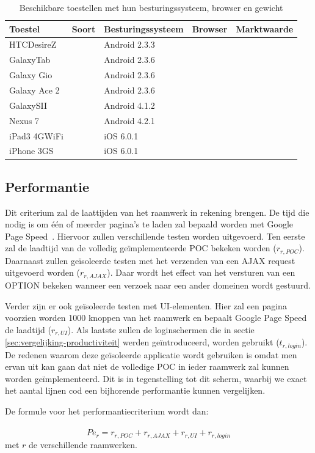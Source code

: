 \begin{table}[h]
  \centering
  \begin{tabular}{lllll}
    \toprule
    \textbf{Toestel} & \textbf{Soort} &\textbf{Besturingssysteem} & \textbf{Browser} & \textbf{Marktwaarde}\\
    \midrule
    HTCDesireZ & & Android 2.3.3 &  & \\
    GalaxyTab & & Android 2.3.6 &  & \\
    Galaxy Gio & & Android 2.3.6 &  & \\
    Galaxy Ace 2 & & Android 2.3.6 &  & \\
    GalaxySII & & Android 4.1.2 &  & \\
    Nexus 7 & &Android 4.2.1  &  & \\
    iPad3 4GWiFi & & iOS 6.0.1 &  & \\
    iPhone 3GS & & iOS 6.0.1 &  & \\
    \bottomrule
  \end{tabular}
  \caption{Beschikbare toestellen met hun besturingssysteem, browser en gewicht}
  \label{tabel:toestellen-hci}
\end{table}

\subsection{Performantie}
\label{sec:vergelijking-performantie}
Dit criterium zal de laattijden van het raamwerk in rekening brengen.
De tijd die nodig is om één of meerder pagina's te laden zal bepaald worden met Google Page Speed~\cite{Morgan2011}. 
Hiervoor zullen verschillende testen worden uitgevoerd. 
Ten eerste zal de laadtijd van de volledig geïmplementeerde POC bekeken worden ($r_{r,POC}$). 
Daarnaast zullen geïsoleerde testen met het verzenden van een AJAX request uitgevoerd worden ($r_{r,AJAX}$).
Daar wordt het effect van het versturen van een OPTION  bekeken wanneer een verzoek naar een ander domeinen wordt gestuurd.

Verder zijn er ook geïsoleerde testen met UI-elementen. 
Hier zal een  pagina voorzien worden 1000 knoppen van het raamwerk en bepaalt Google Page Speed de laadtijd ($r_{r,UI}$). 
Als laatste zullen de loginschermen die in sectie \ref{sec:vergelijking-productiviteit} werden geïntroduceerd, worden gebruikt ($t_{r,login}$). 
De redenen waarom deze geïsoleerde applicatie wordt gebruiken is omdat men ervan uit kan gaan dat niet de volledige POC in ieder raamwerk zal kunnen worden geïmplementeerd. 
Dit is in tegenstelling tot dit scherm, waarbij we exact het aantal lijnen cod een bijhorende performantie kunnen vergelijken.

De formule voor het performantiecriterium wordt dan: 
\paragraph{}
\begin{equation}
  Pe_r=r_{r,POC}+r_{r,AJAX}+r_{r,UI}+r_{r,login} 
  \label{eq:performantie}
\end{equation}
met $r$ de verschillende raamwerken.
